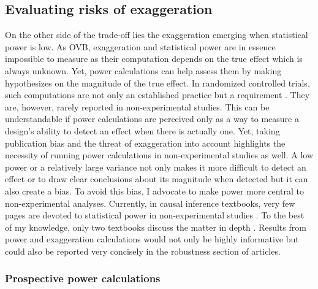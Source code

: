 \documentclass[usletter, 12pt]{article}
\begin{document}
		\subsection{Evaluating risks of exaggeration}

			On the other side of the trade-off lies the exaggeration emerging when statistical power is low. As OVB, exaggeration and statistical power are in essence impossible to measure as their computation depends on the true effect which is always unknown. Yet, power calculations can help assess them by making hypothesizes on the magnitude of the true effect. In randomized controlled trials, such computations are not only an established practice but a requirement \citep{duflo_using_2007, mcconnell_going_2015, athey_econometrics_2016}. They are, however, rarely reported in non-experimental studies. This can be understandable if power calculations are perceived only as a way to measure a design's ability to detect an effect when there is actually one. Yet, taking publication bias and the threat of exaggeration into account highlights the necessity of running power calculations in non-experimental studies as well. A low power or a relatively large variance not only makes it more difficult to detect an effect or to draw clear conclusions about its magnitude when detected but it can also create a bias. To avoid this bias, I advocate to make power more central to non-experimental analyses. Currently, in causal inference textbooks, very few pages are devoted to statistical power in non-experimental studies \citep{angrist_mostly_2009, angrist_mastering_2014, imbens_causal_2015, cunningham_causal_2021}. To the best of my knowledge, only two textbooks discuss the matter in depth \citep{shadish_experimental_2002, huntington-klein_effect_2021}. Results from power and exaggeration calculations would not only be highly informative but could also be reported very concisely in the robustness section of articles. 
			
			\subsubsection{Prospective power calculations}
						
\end{document}
